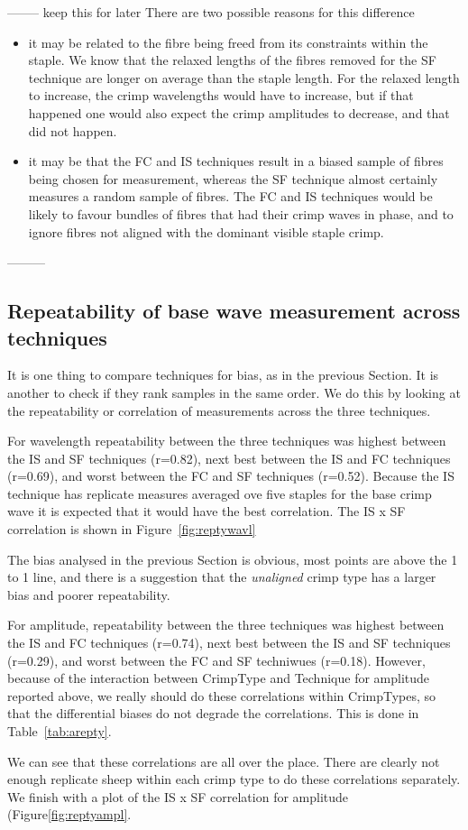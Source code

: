 \documentclass[titlepage,10pt]{article}  %
\begin{document}
 -------- keep this for later
There are two possible reasons for this difference
\begin{itemize}
\item it may be related to the fibre being freed from its constraints within the staple. We know that the relaxed lengths of the fibres removed for the SF technique are longer on average than the staple length. For the relaxed length to increase, the crimp wavelengths would have to increase, but if that happened one would also expect the crimp amplitudes to decrease, and that did not happen.
\item it may be that the FC and IS techniques result in a biased sample of fibres being chosen for measurement, whereas the SF technique almost certainly measures a random sample of fibres. The FC and IS techniques would be likely to favour bundles of fibres that had their crimp waves in phase, and to ignore fibres not aligned with the dominant visible staple crimp.
\end{itemize}
 ---------

\subsection{Repeatability of base wave measurement across techniques}
\label{sec:repty}
It is one thing to compare techniques for bias, as in the previous Section. It is another to check if they rank samples in the same order. We do this by looking at the repeatability or correlation of measurements across the three techniques.

     For wavelength repeatability between the three techniques was highest between the IS and SF techniques (r=0.82), next best between the IS and FC techniques (r=0.69), and worst between the FC and SF techniques (r=0.52). Because the IS technique has replicate measures averaged ove five staples for the base crimp wave it is expected that it would have the best correlation. The IS x SF correlation is shown in Figure~\ref{fig:reptywavl}

The bias analysed in the previous Section is obvious, most points are above the 1 to 1 line, and there is a suggestion that the {\em unaligned} crimp type has a larger bias and poorer repeatability.

	For amplitude, repeatability between the three techniques was highest between the IS and FC techniques (r=0.74), next best between the IS and SF techniques (r=0.29), and worst between the FC and SF techniwues (r=0.18). However, because of the interaction between CrimpType and Technique for amplitude reported above, we really should do these correlations within CrimpTypes, so that the differential biases do not degrade the correlations. This is done in Table~\ref{tab:arepty}.

We can see that these correlations are all over the place. There are clearly not enough replicate sheep within each crimp type to do these correlations separately.
	We finish with a plot of the IS x SF correlation for amplitude (Figure\ref{fig:reptyampl}. 
\end{document}
